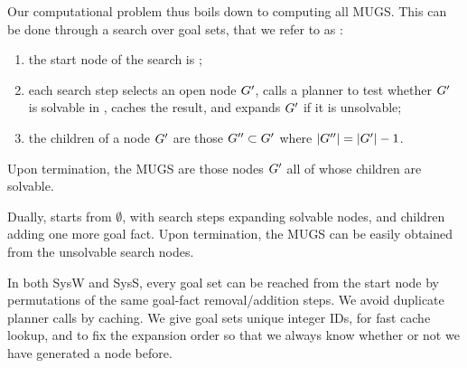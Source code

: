 Our computational problem thus boils down to computing all MUGS. This
can be done through a search over goal sets, that we refer to as
:
\begin{enumerate}[(1)]
\item the start node of the search is \goal; 
\item each search step selects an open node $G'$, calls a planner
  to test whether $G'$ is solvable in \task, caches the result,
  and expands $G'$ if it is unsolvable;
\item the children of a node $G'$ are those $G'' \subset
  G'$ where $|G''| = |G'|-1$.
\end{enumerate}
Upon termination, the MUGS are those nodes $G'$ all of whose
children are solvable. 

Dually,  starts from
$\emptyset$, with search steps expanding solvable nodes, and children
adding one more goal fact. Upon termination, the MUGS can be easily
obtained from the unsolvable search nodes.

%
%
%
%
%
%
%

In both SysW and SysS, every goal set can be reached from the start
node by permutations of the same goal-fact removal/addition steps. We
avoid duplicate planner calls by caching. We give goal sets unique
integer IDs, for fast cache lookup, and to fix the expansion order so
that we always know whether or not we have generated a node before.


